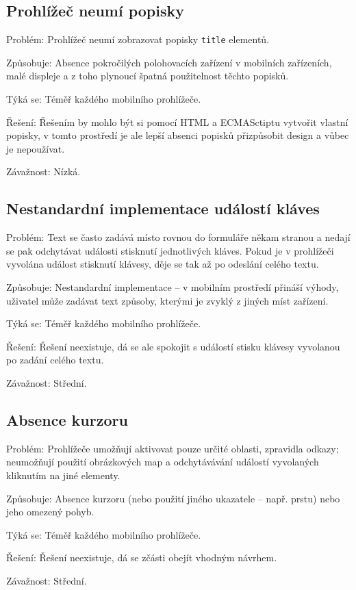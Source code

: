\subsection{Prohlížeč neumí popisky}
\begin{description*}
\item[Problém:] Prohlížeč neumí zobrazovat popisky \texttt{title} elementů.
\item[Způsobuje:] Absence pokročilých polohovacích zařízení v mobilních zařízeních, malé displeje a z toho plynoucí špatná použitelnost těchto popisků.
\item[Týká se:] Téměř každého mobilního prohlížeče.
\item[Řešení:] Řešením by mohlo být si pomocí HTML a ECMASctiptu vytvořit vlastní popisky, v tomto prostředí je ale lepší absenci popisků přizpůsobit design a vůbec je nepoužívat.
\item[Závažnost:] Nízká.
\end{description*}

\subsection{Nestandardní implementace událostí kláves}
\label{subs:udalostiKlaves}
\begin{description*}
\item[Problém:] Text se často zadává místo rovnou do formuláře někam stranou a nedají se pak odchytávat události stisknutí jednotlivých kláves. Pokud je v prohlížeči vyvolána událost stisknutí klávesy, děje se tak až po odeslání celého textu.
\item[Způsobuje:] Nestandardní implementace -- v mobilním prostředí přináší výhody, uživatel může zadávat text způsoby, kterými je zvyklý z jiných míst zařízení.
\item[Týká se:] Téměř každého mobilního prohlížeče.
\item[Řešení:] Řešení neexistuje, dá se ale spokojit s událostí stisku klávesy vyvolanou po zadání celého textu.
\item[Závažnost:] Střední.
\end{description*}

\subsection{Absence kurzoru}
\begin{description*}
\item[Problém:] Prohlížeče umožňují aktivovat pouze určité oblasti, zpravidla odkazy; neumožňují použití obrázkových map a odchytávávání událostí vyvolaných kliknutím na jiné elementy.
\item[Způsobuje:] Absence kurzoru (nebo použití jiného ukazatele -- např. prstu) nebo jeho omezený pohyb.
\item[Týká se:] Téměř každého mobilního prohlížeče.
\item[Řešení:] Řešení neexistuje, dá se zčásti obejít vhodným návrhem.
\item[Závažnost:] Střední.
\end{description*}

